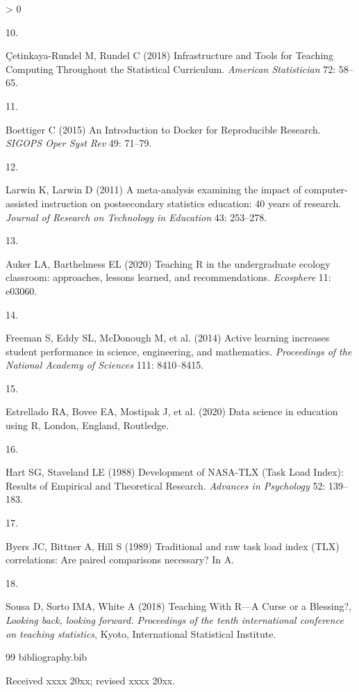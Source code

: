 \documentclass{aims}
\theoremstyle{definition}
\newlength{\cslhangindent}
\newlength{\csllabelwidth}
\newenvironment{CSLReferences}[3] %
   {%
    \setlength{\parindent}{0pt}
    \ifodd #1 \everypar{\setlength{\hangindent}{\cslhangindent}}\ignorespaces\fi
    \ifnum #2 > 0
    \setlength{\parskip}{#2\baselineskip}
    \fi
   }%
   {}
\newcommand{\CSLLeftMargin}[1]{\parbox[t]{\maxof{\widthof{#1}}{\csllabelwidth}}{#1}}
\newcommand{\CSLRightInline}[1]{\parbox[t]{\linewidth}{#1}}
\begin{document}
\begin{CSLReferences}{0}{0}
\leavevmode\hypertarget{ref-Cetinkaya-Rundel2018}{}%
\CSLLeftMargin{10. }
\CSLRightInline{Çetinkaya-Rundel M, Rundel C (2018) {Infrastructure and
Tools for Teaching Computing Throughout the Statistical Curriculum}.
\emph{American Statistician} 72: 58--65.}

\leavevmode\hypertarget{ref-Boettiger2015}{}%
\CSLLeftMargin{11. }
\CSLRightInline{Boettiger C (2015) {An Introduction to Docker for
Reproducible Research}. \emph{SIGOPS Oper Syst Rev} 49: 71--79.}

\leavevmode\hypertarget{ref-Larwin2011}{}%
\CSLLeftMargin{12. }
\CSLRightInline{Larwin K, Larwin D (2011) {A meta-analysis examining the
impact of computer-assisted instruction on postsecondary statistics
education: 40 years of research}. \emph{Journal of Research on
Technology in Education} 43: 253--278.}

\leavevmode\hypertarget{ref-Auker2020}{}%
\CSLLeftMargin{13. }
\CSLRightInline{Auker LA, Barthelmess EL (2020) {Teaching R in the
undergraduate ecology classroom: approaches, lessons learned, and
recommendations}. \emph{Ecosphere} 11: e03060.}

\leavevmode\hypertarget{ref-Freeman2014}{}%
\CSLLeftMargin{14. }
\CSLRightInline{Freeman S, Eddy SL, McDonough M, et al. (2014) {Active
learning increases student performance in science, engineering, and
mathematics}. \emph{Proceedings of the National Academy of Sciences}
111: 8410--8415.}

\leavevmode\hypertarget{ref-Estrellado2020}{}%
\CSLLeftMargin{15. }
\CSLRightInline{Estrellado RA, Bovee EA, Mostipak J, et al. (2020) {Data
science in education using R}, London, England, Routledge.}

\leavevmode\hypertarget{ref-Hart1988}{}%
\CSLLeftMargin{16. }
\CSLRightInline{Hart SG, Staveland LE (1988) {Development of NASA-TLX
(Task Load Index): Results of Empirical and Theoretical Research}.
\emph{Advances in Psychology} 52: 139--183.}

\leavevmode\hypertarget{ref-Byers1989}{}%
\CSLLeftMargin{17. }
\CSLRightInline{Byers JC, Bittner A, Hill S (1989) {Traditional and raw
task load index (TLX) correlations: Are paired comparisons necessary? In
A}.}

\leavevmode\hypertarget{ref-Sousa2018}{}%
\CSLLeftMargin{18. }
\CSLRightInline{Sousa D, Sorto IMA, White A (2018) {Teaching With R---A
Curse or a Blessing?}, \emph{Looking back, looking forward. Proceedings
of the tenth international conference on teaching statistics}, Kyoto,
International Statistical Institute.}

\end{CSLReferences}


\begin{thebibliography}{99}
bibliography.bib
\end{thebibliography}

\medskip
Received xxxx 20xx; revised xxxx 20xx.
\medskip
\end{document}
